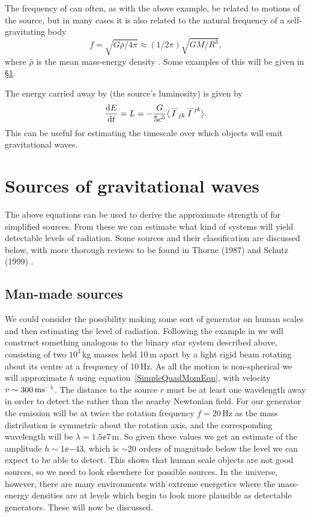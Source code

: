 The frequency of \gws can often, as with the above example, be related to motions of the source,
but in many cases it is also related to the natural frequency of a self-gravitating body 
\begin{equation}\label{naturalfreq}
f = \sqrt{G\bar{\rho}/4\pi} \approx (1/2\pi)\sqrt{GM/R^3},
\end{equation}
where $\bar{\rho}$ is the mean mass-energy density \cite{Schutz:1999}. Some examples of this will be
given in \S\ref{GWsources}.

The energy carried away by \gws (the source's luminosity) is given by
\begin{equation}\label{gwluminosity}
\frac{{\rm d}E}{{\rm d}t} = L = -\frac{G}{5c^5}\langle \dddot{I}_{jk}\dddot{I}^{jk}\rangle.
\end{equation}
This can be useful for estimating the timescale over which objects will emit gravitational waves.

\section{Sources of gravitational waves}\label{GWsources}
The above equations can be used to derive the approximate strength of \gws for simplified sources.
From these we can estimate what kind of systems will yield detectable levels of radiation. Some
sources and their classification are discussed below, with more thorough reviews to be found in
Thorne (1987) \cite{300Years} and Schutz (1999) \cite{Schutz:1999}. 

\subsection{Man-made sources}
We could consider the possibility making some sort of \gw generator on human scales and then
estimating the level of radiation. Following the example in \cite{Schutz:1999} we will construct
something analogous to the binary star system described above, consisting of two $10^3$\,kg masses
held 10\,m apart by a light rigid beam rotating about its centre at a frequency of 10\,Hz. As all
the motion is non-spherical we will approximate $h$ using equation~\ref{SimpleQuadMomEqn}, with
velocity $v \sim 300\,{\rm m}{\rm s}^{-1}$. The distance to the source $r$ must be at least one
wavelength away in order to detect the \gws rather than the nearby Newtonian field. For our
generator the emission will be at twice the rotation frequency $f = 20$\,Hz as the mass distribution
is symmetric about the rotation axis, and the corresponding wavelength will be $\lambda =
1.5\ee{7}$\,m. So given these values we get an estimate of the \gw amplitude $h \sim 1\ee{-43}$,
which is $\sim 20$ orders of magnitude below the level we can expect to be able to detect. This
shows that human scale objects are not good sources, so we need to look elsewhere for possible
sources. In the universe, however, there are many environments with extreme energetics where the
mass-energy densities are at levels which begin to look more plausible as detectable \gw generators.
These will now be discussed.

